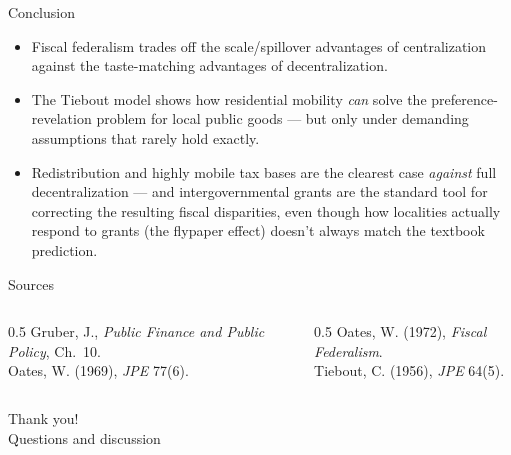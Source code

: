 \documentclass[11pt,aspectratio=169]{beamer}
\begin{document}
\begin{frame}{Conclusion}
  \begin{itemize}
    \item Fiscal federalism trades off the scale/spillover advantages of centralization against the taste-matching advantages of decentralization.
    \item The Tiebout model shows how residential mobility \emph{can} solve the preference-revelation problem for local public goods --- but only under demanding assumptions that rarely hold exactly.
    \item Redistribution and highly mobile tax bases are the clearest case \emph{against} full decentralization --- and intergovernmental grants are the standard tool for correcting the resulting fiscal disparities, even though how localities actually respond to grants (the flypaper effect) doesn't always match the textbook prediction.
  \end{itemize}
\end{frame}

\begin{frame}{Sources}
  \tiny
  \begin{columns}[T]
    \begin{column}{0.5\textwidth}
      Gruber, J., \emph{Public Finance and Public Policy}, Ch.\ 10.\\
      Oates, W. (1969), \emph{JPE} 77(6).
    \end{column}
    \begin{column}{0.5\textwidth}
      Oates, W. (1972), \emph{Fiscal Federalism}.\\
      Tiebout, C. (1956), \emph{JPE} 64(5).
    \end{column}
  \end{columns}
\end{frame}

\begin{frame}[standout]
  Thank you!\\
  \vspace{0.5em}
  \small Questions and discussion
\end{frame}
\end{document}
